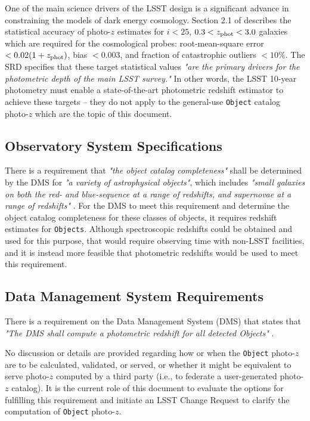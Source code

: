 \documentclass[DM,lsstdraft,toc]{lsstdoc}
\begin{document}
One of the main science drivers of the LSST design is a significant advance in constraining the models of dark energy cosmology. 
Section 2.1 of  describes the statistical accuracy of photo-$z$ estimates for $i<25$, $0.3<z_{\rm phot}<3.0$ galaxies which are required for the cosmological probes: root-mean-square error $<0.02(1+z_{\rm phot})$, bias $<0.003$, and fraction of catastrophic outliers $<10\%$.
The SRD specifies that these target statistical values {\it "are the primary drivers for the photometric depth of the main LSST survey."} 
In other words, the LSST 10-year photometry must enable a state-of-the-art photometric redshift estimator to achieve these targets -- they do not apply to the general-use {\tt Object} catalog photo-$z$ which are the topic of this document.

\subsection{Observatory System Specifications}\label{ssec:docs_oss}

There is a requirement that {\it "the object catalog completeness"} shall be determined by the DMS for {\it "a variety of astrophysical objects"}, which includes {\it "small galaxies on both the red- and blue-sequence at a range of redshifts, and supernovae at a range of redshifts"} . 
For the DMS to meet this requirement and determine the object catalog completeness for these classes of objects, it requires redshift estimates for {\tt Objects}.
Although spectroscopic redshifts could be obtained and used for this purpose, that would require observing time with non-LSST facilities, and it is instead more feasible that photometric redshifts would be used to meet this requirement.

\subsection{Data Management System Requirements}\label{ssec:docs_dmsr}

There is a requirement on the Data Management System (DMS) that states that {\it "The DMS shall compute a photometric redshift for all detected Objects"} . 

No discussion or details are provided regarding how or when the {\tt Object} photo-$z$ are to be calculated, validated, or served, or whether it might be equivalent to serve photo-$z$ computed by a third party (i.e., to federate a user-generated photo-$z$ catalog).
It is the current role of this document to evaluate the options for fulfilling this requirement and initiate an LSST Change Request to clarify the computation of {\tt Object} photo-$z$.
\end{document}
